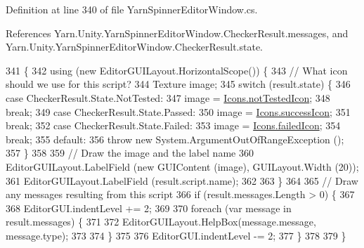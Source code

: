 Definition at line 340 of file Yarn\-Spinner\-Editor\-Window.\-cs.



References Yarn.\-Unity.\-Yarn\-Spinner\-Editor\-Window.\-Checker\-Result.\-messages, and Yarn.\-Unity.\-Yarn\-Spinner\-Editor\-Window.\-Checker\-Result.\-state.


\begin{DoxyCode}
341         \{
342             \textcolor{keyword}{using} (\textcolor{keyword}{new} EditorGUILayout.HorizontalScope()) \{
343                 \textcolor{comment}{// What icon should we use for this script?}
344                 Texture image;
345                 \textcolor{keywordflow}{switch} (result.state) \{
346                 \textcolor{keywordflow}{case} CheckerResult.State.NotTested:
347                     image = \hyperlink{a00113_ab8afce565cd2ad1543d1e32e7e589e77}{Icons.notTestedIcon};
348                     \textcolor{keywordflow}{break};
349                 \textcolor{keywordflow}{case} CheckerResult.State.Passed:
350                     image = \hyperlink{a00113_aec8aea03eb6e31771ebc98e0611fff79}{Icons.successIcon};
351                     \textcolor{keywordflow}{break};
352                 \textcolor{keywordflow}{case} CheckerResult.State.Failed:
353                     image = \hyperlink{a00113_aae7cc0e5016db04a90b2aa0e80957626}{Icons.failedIcon};
354                     \textcolor{keywordflow}{break};
355                 \textcolor{keywordflow}{default}:
356                     \textcolor{keywordflow}{throw} \textcolor{keyword}{new} System.ArgumentOutOfRangeException ();
357                 \}
358 
359                 \textcolor{comment}{// Draw the image and the label name}
360                 EditorGUILayout.LabelField (\textcolor{keyword}{new} GUIContent (image), GUILayout.Width (20));
361                 EditorGUILayout.LabelField (result.script.name);
362 
363             \}
364 
365             \textcolor{comment}{// Draw any messages resulting from this script}
366             \textcolor{keywordflow}{if} (result.messages.Length > 0) \{
367 
368                 EditorGUI.indentLevel += 2;
369 
370                 \textcolor{keywordflow}{foreach} (var message \textcolor{keywordflow}{in} result.messages) \{
371 
372                     EditorGUILayout.HelpBox(message.message, message.type);
373 
374                 \}
375 
376                 EditorGUI.indentLevel -= 2;
377             \}
378 
379         \}
\end{DoxyCode}
